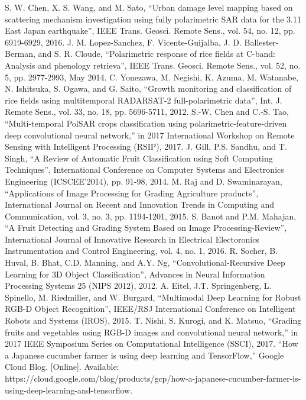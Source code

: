 \documentclass[conference,table]{IEEEtran}
\begin{document}
\begin{thebibliography}{00}
		 S. W. Chen, X. S. Wang, and M. Sato, ``Urban damage level mapping based on scattering mechanism investigation using fully polarimetric SAR data for the 3.11 East Japan earthquake'', IEEE Trans. Geosci. Remote Sens., vol. 54, no. 12, pp. 6919-6929, 2016.
		 J. M. Lopez-Sanchez, F. Vicente-Guijalba, J. D. Ballester-Berman, and S. R. Cloude, ``Polarimetric response of rice fields at C-band: Analysis and phenology retrieva'', IEEE Trans. Geosci. Remote Sens., vol. 52, no. 5, pp. 2977-2993, May 2014.
		 C. Yonezawa, M. Negishi, K. Azuma, M. Watanabe, N. Ishitsuka, S. Ogawa, and G. Saito, ``Growth monitoring and classification of rice fields using multitemporal RADARSAT-2 full-polarimetric data'', Int. J. Remote Sens., vol. 33, no. 18, pp. 5696-5711, 2012.
		 S.-W. Chen and C.-S. Tao, ``Multi-temporal PolSAR crops classification using polarimetric-feature-driven deep convolutional neural network,'' in 2017 International Workshop on Remote Sensing with Intelligent Processing (RSIP), 2017.
		 J. Gill, P.S. Sandhu, and T. Singh, ``A Review of Automatic Fruit Classification using Soft Computing Techniques'', International Conference on Computer Systems and Electronics Engineering (ICSCEE'2014), pp. 91-98, 2014.
		 M. Raj and D. Swaminarayan, ``Applications of Image Processing for Grading Agriculture products'', International Journal on Recent and Innovation Trends in Computing and Communication, vol. 3, no. 3, pp. 1194-1201, 2015.
		 S. Banot and P.M. Mahajan, ``A Fruit Detecting and Grading System Based on Image Processing-Review'', International Journal of Innovative Research in Electrical Electoronics Instrumentation and Control Engineering, vol. 4, no. 1, 2016.
		 R. Socher, B. Huval, B. Bhat, C.D. Manning, and A.Y. Ng, ``Convolutional-Recursive Deep Learning for 3D Object Classification'', Advances in Neural Information Processing Systems 25 (NIPS 2012), 2012.
		 A. Eitel, J.T. Springenberg, L. Spinello, M. Riedmiller, and W. Burgard, ``Multimodal Deep Learning for Robust RGB-D Object Recognition'', IEEE/RSJ International Conference on Intelligent Robots and Systems (IROS), 2015.
		 T. Nishi, S. Kurogi, and K. Matsuo, ``Grading fruits and vegetables using RGB-D images and convolutional neural network,'' in 2017 IEEE Symposium Series on Computational Intelligence (SSCI), 2017.
		 ``How a Japanese cucumber farmer is using deep learning and TensorFlow,'' Google Cloud Blog. [Online]. Available: https://cloud.google.com/blog/products/gcp/how-a-japanese-cucumber-farmer-is-using-deep-learning-and-tensorflow.

\end{thebibliography}
\end{document}
